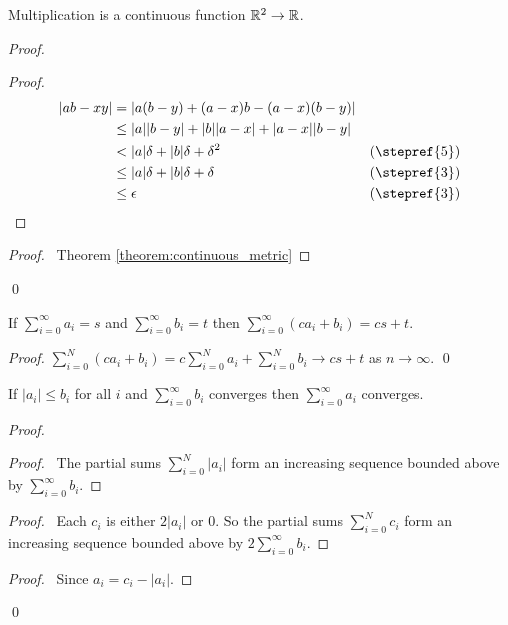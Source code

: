 \begin{theorem}
    Multiplication is a continuous function $\mathbb{R}^2 \rightarrow \mathbb{R}$.
\end{theorem}

\begin{proof}
    \pf
    \begin{proof}
        \pf
        \begin{align*}
            |ab - xy| & = |a(b-y) + (a-x)b - (a-x)(b-y)| \\
            & \leq |a| |b-y| + |b| |a-x| + |a-x| |b-y| \\
            & < |a| \delta + |b| \delta + \delta^2 & (\text{\stepref{5}})\\
            & \leq |a| \delta + |b| \delta + \delta & (\text{\stepref{3}})\\
            & \leq \epsilon & (\text{\stepref{3}})
        \end{align*}
    \end{proof}
    \qedstep
    \begin{proof}
        \pf\ Theorem \ref{theorem:continuous_metric}
    \end{proof}
    \qed
\end{proof}

\begin{theorem}
    If $\sum_{i=0}^\infty a_i = s$ and $\sum_{i=0}^\infty b_i = t$ then $\sum_{i=0}^\infty (ca_i + b_i) = cs+t$.
\end{theorem}

\begin{proof}
    \pf $\sum_{i=0}^N (ca_i + b_i) = c \sum_{i=0}^N a_i + \sum_{i=0}^N b_i \rightarrow cs+t$ as $n \rightarrow \infty$. \qed
\end{proof}

\begin{theorem}
    If $|a_i| \leq b_i$ for all $i$ and $\sum_{i=0}^\infty b_i$ converges then $\sum_{i=0}^\infty a_i$ converges.
\end{theorem}

\begin{proof}
    \pf
    \begin{proof}
        \pf\ The partial sums $\sum_{i=0}^N |a_i|$ form an increasing sequence bounded above by $\sum_{i=0}^\infty b_i$.
    \end{proof}
    \begin{proof}
        \pf\ Each $c_i$ is either $2|a_i|$ or 0. So the partial sums $\sum_{i=0}^N c_i$ form an increasing sequence bounded above by $2 \sum_{i=0}^\infty b_i$.
    \end{proof}
    \qedstep
    \begin{proof}
        \pf\ Since $a_i = c_i - |a_i|$.
    \end{proof}
    \qed
\end{proof}

